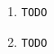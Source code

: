 \documentclass[11pt]{article}
\begin{document}
\begin{enumerate}[1.]
\item \texttt{TODO}
\item \texttt{TODO}

\end{enumerate}
\end{document}
